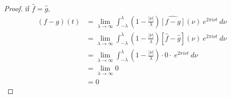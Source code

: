 \documentclass[12pt, reqno]{amsart}
\theoremstyle{definition}
\theoremstyle{remark}
\newcommand{\ud}{\mathrm{d}}
\begin{document}
\begin{itemize}
\begin{itemize}
\begin{proof}
    if $\widehat f=\widehat g$, 
\begin{align*}
(f-g)(t)&= \lim_{\lambda \rightarrow \infty}\int_{-\lambda}^{\lambda}\left(1- \frac{|\nu|}{\lambda}\right)\widehat {[f-g]}(\nu)~e^{2\pi i \nu t}\ d \nu\\
&= \lim_{\lambda \rightarrow \infty}\int_{-\lambda}^{\lambda}\left(1- \frac{|\nu|}{\lambda}\right)[\widehat f-\widehat g](\nu)~e^{2\pi i \nu t}\ d \nu\\
&= \lim_{\lambda \rightarrow \infty}\int_{-\lambda}^{\lambda}\left(1- \frac{|\nu|}{\lambda}\right)\cdot 0\cdot~e^{2\pi i \nu t}\ d \nu\\
&= \lim_{\lambda\rightarrow \infty}0\\
&= 0
\end{align*}


\end{proof}


\end{itemize}




\end{itemize}
\end{document}
